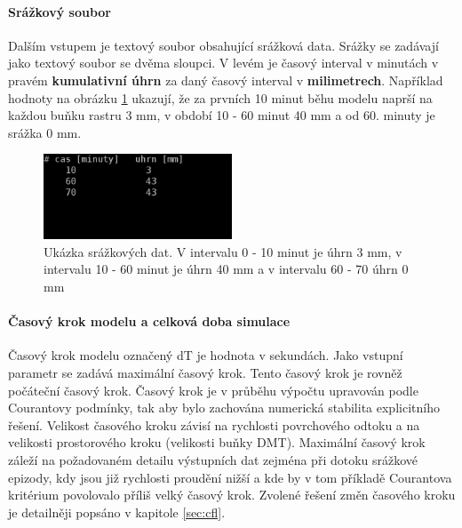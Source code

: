 \paragraph{Srážkový soubor} \label{sec:vstupsrazka}

Dalším vstupem je textový soubor obsahující srážková data. 
% 
% 
% 
Srážky se zadávají jako textový soubor se dvěma sloupci. V levém je časový interval v minutách v pravém \textbf{kumulativní úhrn} za daný časový interval v \textbf{milimetrech}. Například hodnoty na obrázku \ref{fig:srazkovysoubor} ukazují, že za prvních 10 minut běhu modelu naprší  na každou buňku rastru 3 mm, v období 10 - 60 minut 40 mm a od 60. minuty je srážka 0 mm. 
\begin{figure}
  \centering
  \includegraphics[width=0.5\textwidth]{./img/srazka.png}
  \caption{Ukázka srážkových dat. V intervalu 0 - 10 minut je úhrn 3 mm, v intervalu 10 - 60 minut je úhrn 40 mm a v intervalu 60 - 70 úhrn 0 mm}
  \label{fig:srazkovysoubor}
\end{figure}


\paragraph{Časový krok modelu a celková doba simulace} \label{sec:vstupkrok}

Časový krok modelu označený \acs{dT} je hodnota v sekundách. Jako vstupní parametr se zadává maximální časový krok. Tento časový krok je rovněž počáteční časový krok. Časový krok je v průběhu výpočtu upravován podle Courantovy podmínky, tak aby bylo zachována numerická stabilita explicitního řešení. Velikost časového kroku závisí na rychlosti povrchového odtoku a na velikosti prostorového kroku (velikosti buňky DMT). Maximální časový krok záleží na požadovaném detailu výstupních dat zejména při dotoku srážkové epizody, kdy jsou již rychlosti proudění nižší a kde by v tom příkladě Courantova kritérium povolovalo příliš velký časový krok. Zvolené řešení změn časového kroku je detailněji popsáno v kapitole \ref{sec:cfl}. 

